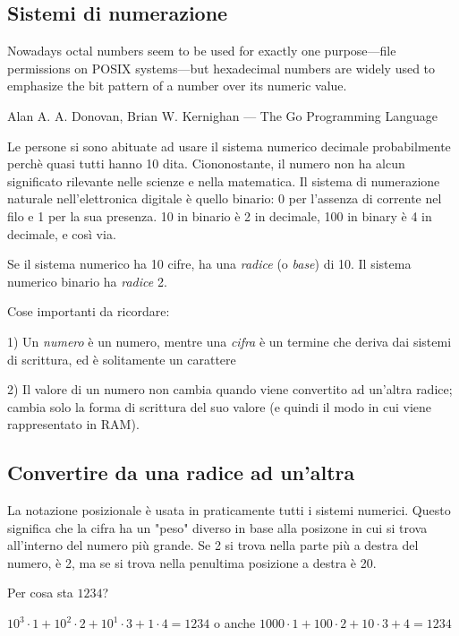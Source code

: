 \subsection{Sistemi di numerazione}

\epigraph{Nowadays octal numbers seem to be
used for exactly one purpose---file permissions on POSIX systems---but hexadecimal numbers
are widely used to emphasize the bit pattern of a number over its numeric value.}
{Alan A. A. Donovan, Brian W. Kernighan ---  The Go Programming Language}

Le persone si sono abituate ad usare il sistema numerico decimale probabilmente perchè quasi tutti hanno 10 dita.
Ciononostante, il numero  non ha alcun significato rilevante nelle scienze e nella matematica.
Il sistema di numerazione naturale nell'elettronica digitale è quello binario: 0 per l'assenza di corrente nel filo e 1 per la sua presenza.
10 in binario è 2 in decimale, 100 in binary è 4 in decimale, e così via.

Se il sistema numerico ha 10 cifre, ha una \emph{radice} (o \emph{base}) di 10.
Il sistema numerico binario ha \emph{radice} 2.

Cose importanti da ricordare:

1) Un \emph{numero} è un numero, mentre una \emph{cifra} è un termine che deriva dai sistemi di scrittura,
ed è solitamente un carattere

2) Il valore di un numero non cambia quando viene convertito ad un'altra radice;
cambia solo la forma di scrittura del suo valore (e quindi il modo in cui viene rappresentato in \ac{RAM}).

\subsection{Convertire da una radice ad un'altra}

La notazione posizionale è usata in praticamente tutti i sistemi numerici.
Questo significa che la cifra ha un "peso" diverso in base alla posizone in cui si trova all'interno del numero più grande.
Se 2 si trova nella parte più a destra del numero, è 2, ma se si trova nella penultima posizione a destra è 20.

Per cosa sta $1234$?

$10^3 \cdot 1 + 10^2 \cdot 2 + 10^1 \cdot 3 + 1 \cdot 4 = 1234$ o anche
$1000 \cdot 1 + 100 \cdot 2 + 10 \cdot 3 + 4 = 1234$

